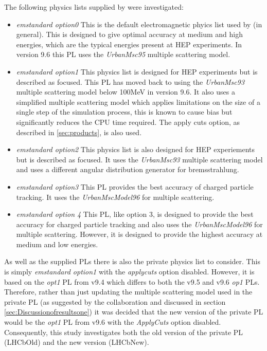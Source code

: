 The following physics lists supplied by \geant were investigated:
\begin{itemize}
\item \textit{emstandard option0}
  This is the default electromagnetic phyics list used by \geant (in general).  This is designed to give optimal accuracy at medium and high energies, which are the typical energies present at HEP experiments.  In version 9.6 this PL uses the \textit{UrbanMsc95} multiple scattering model.
\item \textit{emstandard option1}
  This physics list is designed for HEP experiments but is described as \cms focused. This PL has moved back to using the \textit{UrbanMsc93} multiple scattering model below 100MeV in version 9.6.  It also uses a simplified multiple scattering model which applies limitations on the size of a single step of the simulation process, this is known to cause bias but significantly reduces the CPU time required.  The apply cuts option, as described in \ref{sec:products}, is also used.
\item \textit{emstandard option2}
  This physics list is also designed for HEP experiements but is described as \lhcb focused.  It uses the \textit{UrbanMsc93} multiple scattering model and uses a different angular distribution generator for bremsstrahlung.
\item \textit{emstandard option3}
  This PL provides the best accuracy of charged particle tracking.  It uses the \textit{UrbanMscModel96} for multiple scattering.
\item \textit{emstandard option 4}
  This PL, like option 3, is designed to provide the best accuracy for charged particle tracking and also uses the \textit{UrbanMscModel96} for multiple scattering.  However, it is designed to provide the highest accuracy at medium and low energies.
\end{itemize}

As well as the \geant supplied PLs there is also the \lhcb private physics list to consider.  This is simply \textit{emstandard option1} with the \textit{applycuts} option disabled.  However, it is based on the \textit{opt1} PL from \geant v9.4 which differs to both the v9.5 and v9.6 \textit{op1} PLs.  Therefore, rather than just updating the multiple scattering model used in the \lhcb private PL (as suggested by the \geant collaboration  and discussed in section \ref{sec:Discussionofresultsone}) it was decided that the new version of the \lhcb private PL would be the \textit{opt1} PL from v9.6 with the \textit{ApplyCuts} option disabled. Consequently, this study investigates both the old version of the \lhcb private PL (LHCbOld) and the new version (LHCbNew).

